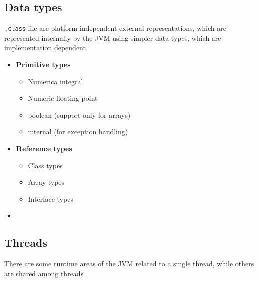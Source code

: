 \subsection{Data types}
\lstinline{.class} file are platform independent external representations, which are represented internally by the JVM using simpler data types, which are implementation dependent.
\begin{itemize}
    \item \textbf{Primitive types}
    \begin{itemize}
        \item Numerica integral
        \item Numeric floating point
        \item boolean (support only for arrays)
        \item internal (for exception handling)
    \end{itemize}
    \item \textbf{Reference types}
    \begin{itemize}
        \item Class types
        \item Array types
        \item Interface types
    \end{itemize}
    \item[] 
\end{itemize}

\subsection{Threads}
There are some runtime areas of the JVM related to a single thread, while others are shared among threads

